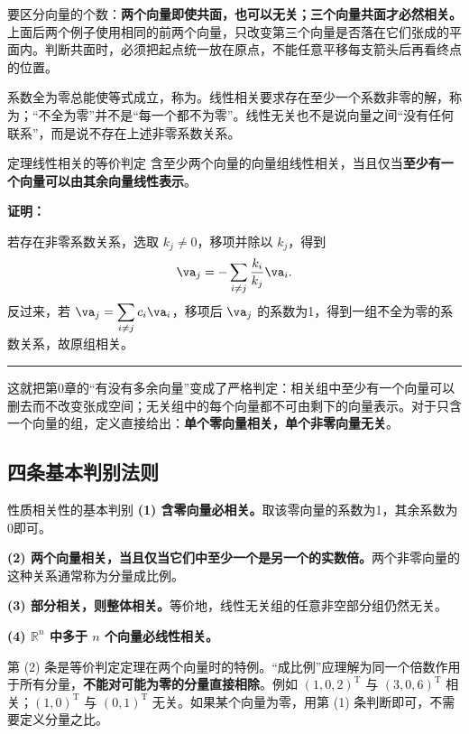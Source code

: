 \documentclass[a4paper,12pt,twoside,openany,fontset=none]{ctexbook}
\let\oldsum\sum
\renewcommand{\sum}{\displaystyle\oldsum}
\newcounter{theorem}[chapter]
\newenvironment{theorem}[1][]{\begin{thmBox}{定理}{#1}}{\end{thmBox}}
\newenvironment{property}[1][]{\begin{thmBox}{性质}{#1}}{\end{thmBox}}
\renewenvironment{proof}{
    \par\vspace{0.5em}\noindent
    \textbf{\color{LogicColor} 证明：}
}{
    \hfill \textcolor{LogicColor}{\rule{0.6em}{0.6em}} \par
}
\numberwithin{equation}{chapter}
\begin{document}
要区分向量的个数：\textbf{两个向量即使共面，也可以无关；三个向量共面才必然相关。}上面后两个例子使用相同的前两个向量，只改变第三个向量是否落在它们张成的平面内。判断共面时，必须把起点统一放在原点，不能任意平移每支箭头后再看终点的位置。

系数全为零总能使等式成立，称为\textbf{}。线性相关要求存在至少一个系数非零的解，称为\textbf{}；“不全为零”并不是“每一个都不为零”。线性无关也不是说向量之间“没有任何联系”，而是说不存在上述非零系数关系。

\begin{theorem}[线性相关的等价判定]
含至少两个向量的向量组线性相关，当且仅当\textbf{至少有一个向量可以由其余向量线性表示}。
\end{theorem}

\begin{proof}
若存在非零系数关系，选取 $k_j\ne0$，移项并除以 $k_j$，得到
\[
    \va_j=-\sum_{i\ne j}\frac{k_i}{k_j}\va_i.
\]
反过来，若 $\va_j=\sum_{i\ne j}c_i\va_i$，移项后 $\va_j$ 的系数为1，得到一组不全为零的系数关系，故原组相关。
\end{proof}

这就把第0章的“有没有多余向量”变成了严格判定：相关组中至少有一个向量可以删去而不改变张成空间；无关组中的每个向量都不可由剩下的向量表示。对于只含一个向量的组，定义直接给出：\textbf{单个零向量相关，单个非零向量无关}。

\subsection*{四条基本判别法则}

\begin{property}[相关性的基本判别]
\textbf{(1) 含零向量必相关。}取该零向量的系数为1，其余系数为0即可。

\textbf{(2) 两个向量相关，当且仅当它们中至少一个是另一个的实数倍。}两个非零向量的这种关系通常称为分量成比例。

\textbf{(3) 部分相关，则整体相关。}等价地，线性无关组的任意非空部分组仍然无关。

\textbf{(4) $\mathbb{R}^n$ 中多于 $n$ 个向量必线性相关。}
\end{property}

第 (2) 条是等价判定定理在两个向量时的特例。“成比例”应理解为同一个倍数作用于所有分量，\textbf{不能对可能为零的分量直接相除}。例如 $(1,0,2)^{\mathrm T}$ 与 $(3,0,6)^{\mathrm T}$ 相关；$(1,0)^{\mathrm T}$ 与 $(0,1)^{\mathrm T}$ 无关。如果某个向量为零，用第 (1) 条判断即可，不需要定义分量之比。
\end{document}
